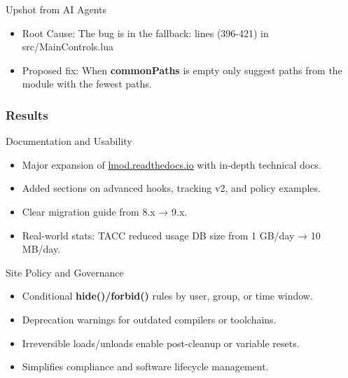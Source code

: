 \documentclass[aspectratio=169]{beamer}
\begin{document}
\begin{frame}{Upshot from AI Agents}
  \begin{itemize}
    \item Root Cause: The bug is in the fallback: lines (396-421) in src/MainControls.lua
    \item Proposed fix: When \textbf{commonPaths} is empty only suggest paths from the module with the fewest paths.
  \end{itemize}
\end{frame}

\begin{frame}[fragile]
    \frametitle{Results}
 {\small
}
\end{frame}

\begin{frame}{Documentation and Usability}
  \begin{itemize}
    \item Major expansion of \href{https://lmod.readthedocs.io}{lmod.readthedocs.io} with in-depth technical docs.
    \item Added sections on advanced hooks, tracking v2, and policy examples.
    \item Clear migration guide from 8.x → 9.x.
    \item Real-world stats: TACC reduced usage DB size from 1 GB/day → 10 MB/day.
  \end{itemize}
\end{frame}

\begin{frame}{Site Policy and Governance}
  \begin{itemize}
    \item Conditional \textbf{hide()/forbid()} rules by user, group, or time window.
    \item Deprecation warnings for outdated compilers or toolchains.
    \item Irreversible loads/unloads enable post-cleanup or variable resets.
    \item Simplifies compliance and software lifecycle management.
  \end{itemize}
\end{frame}
\end{document}
